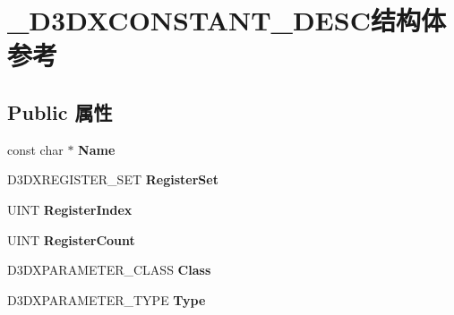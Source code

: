 \hypertarget{struct___d3_d_x_c_o_n_s_t_a_n_t___d_e_s_c}{}\section{\+\_\+\+D3\+D\+X\+C\+O\+N\+S\+T\+A\+N\+T\+\_\+\+D\+E\+S\+C结构体 参考}
\label{struct___d3_d_x_c_o_n_s_t_a_n_t___d_e_s_c}
\subsection*{Public 属性}
\begin{DoxyCompactItemize}
\item 
\mbox{\label{struct___d3_d_x_c_o_n_s_t_a_n_t___d_e_s_c_ac3a749f05a6fb8fba9ad8c741b26bb13}} 
const char $\ast$ {\bfseries Name}
\item 
\mbox{\label{struct___d3_d_x_c_o_n_s_t_a_n_t___d_e_s_c_a877a8e3ca1eb248071521acbb3b40430}} 
D3\+D\+X\+R\+E\+G\+I\+S\+T\+E\+R\+\_\+\+S\+ET {\bfseries Register\+Set}
\item 
\mbox{\label{struct___d3_d_x_c_o_n_s_t_a_n_t___d_e_s_c_a2b576ba1599a5e6a5c7f4ff5968ca35d}} 
U\+I\+NT {\bfseries Register\+Index}
\item 
\mbox{\label{struct___d3_d_x_c_o_n_s_t_a_n_t___d_e_s_c_a8181a39e50f1f99782d83da598c78d51}} 
U\+I\+NT {\bfseries Register\+Count}
\item 
\mbox{\label{struct___d3_d_x_c_o_n_s_t_a_n_t___d_e_s_c_a296615759e3a076a23607dcaae69af15}} 
D3\+D\+X\+P\+A\+R\+A\+M\+E\+T\+E\+R\+\_\+\+C\+L\+A\+SS {\bfseries Class}
\item 
\mbox{\label{struct___d3_d_x_c_o_n_s_t_a_n_t___d_e_s_c_a9578f41fa6bad919a4675503fded4647}} 
D3\+D\+X\+P\+A\+R\+A\+M\+E\+T\+E\+R\+\_\+\+T\+Y\+PE {\bfseries Type}
\item 
\mbox{\label{struct___d3_d_x_c_o_n_s_t_a_n_t___d_e_s_c_a0e38ecd9f14217e4259e6d8d6eb43c7c}} 

\end{DoxyCompactItemize}
